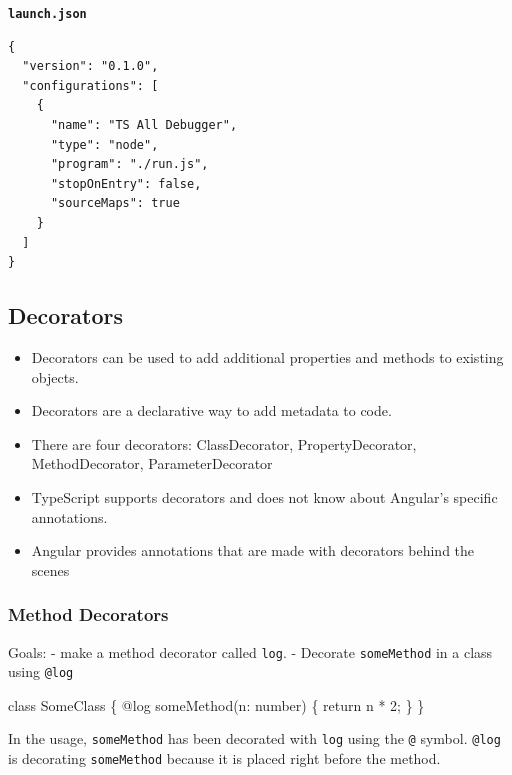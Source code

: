 \documentclass[12pt,]{article}
\newenvironment{Shaded}{}{}
\newcommand{\KeywordTok}[1]{\textcolor[rgb]{0.00,0.00,1.00}{{#1}}}
\newcommand{\DecValTok}[1]{{#1}}
\newcommand{\FunctionTok}[1]{{#1}}
\newcommand{\NormalTok}[1]{{#1}}
\providecommand{\tightlist}{%
  \setlength{\itemsep}{0pt}\setlength{\parskip}{0pt}}
\begin{document}
\textbf{\texttt{launch.json}}

\begin{verbatim}
{
  "version": "0.1.0",
  "configurations": [
    {
      "name": "TS All Debugger",
      "type": "node",
      "program": "./run.js",
      "stopOnEntry": false,
      "sourceMaps": true
    }
  ]
}
\end{verbatim}

\subsection{Decorators}\label{decorators}

\begin{itemize}
\tightlist
\item
  Decorators can be used to add additional properties and methods to
  existing objects.
\item
  Decorators are a declarative way to add metadata to code.
\item
  There are four decorators: ClassDecorator, PropertyDecorator,
  MethodDecorator, ParameterDecorator
\item
  TypeScript supports decorators and does not know about Angular's
  specific annotations.
\item
  Angular provides annotations that are made with decorators behind the
  scenes
\end{itemize}

\subsubsection{Method Decorators}\label{method-decorators}

Goals: - make a method decorator called \texttt{log}. - Decorate
\texttt{someMethod} in a class using \texttt{@log}

\begin{Shaded}
\begin{Highlighting}[numbers=left,,]
\KeywordTok{class} \NormalTok{SomeClass \{}
  \FunctionTok{@log}
  \FunctionTok{someMethod}\NormalTok{(n: number) \{}
    \KeywordTok{return} \NormalTok{n * }\DecValTok{2}\NormalTok{;}
  \NormalTok{\}}
\NormalTok{\}}
\end{Highlighting}
\end{Shaded}

In the usage, \texttt{someMethod} has been decorated with \texttt{log}
using the \texttt{@} symbol. \texttt{@log} is decorating
\texttt{someMethod} because it is placed right before the method.
\end{document}
